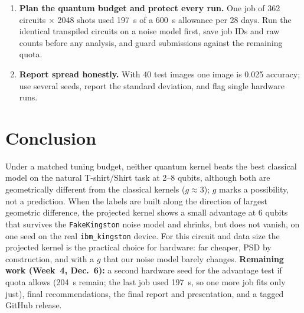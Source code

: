 \documentclass[conference]{IEEEtran}
\begin{document}
\begin{enumerate}
\item \textbf{Plan the quantum budget and protect every run.} One job of 362 circuits $\times$ 2048 shots used 197~s of a 600~s allowance per 28 days. Run the identical transpiled circuits on a noise model first, save job IDs and raw counts before any analysis, and guard submissions against the remaining quota.
\item \textbf{Report spread honestly.} With 40 test images one image is 0.025 accuracy; use several seeds, report the standard deviation, and flag single hardware runs.
\end{enumerate}

\section{Conclusion}
Under a matched tuning budget, neither quantum kernel beats the best classical model on the natural T-shirt/Shirt task at 2--8 qubits, although both are geometrically different from the classical kernels ($g\approx3$); $g$ marks a possibility, not a prediction. When the labels are built along the direction of largest geometric difference, the projected kernel shows a small advantage at 6 qubits that survives the \texttt{FakeKingston} noise model and shrinks, but does not vanish, on one seed on the real \texttt{ibm\_kingston} device. For this circuit and data size the projected kernel is the practical choice for hardware: far cheaper, PSD by construction, and with a $g$ that our noise model barely changes. \textbf{Remaining work (Week~4, Dec.~6):} a second hardware seed for the advantage test if quota allows (204~s remain; the last job used 197~s, so one more job fits only just), final recommendations, the final report and presentation, and a tagged GitHub release.
\end{document}
